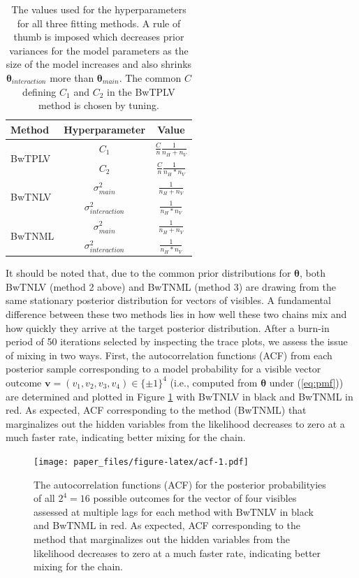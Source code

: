 \documentclass[12pt]{article}
\theoremstyle{definition}
\newcommand{\nv}{{n_{\scriptscriptstyle V}}}
\newcommand{\nh}{{n_{\scriptscriptstyle H}}}
\begin{document}
\begin{table}[ht]
\centering
\begin{tabular}{|l|c|c|}
\hline 
Method & Hyperparameter & Value \\ 
\hline \hline
\multirow{2}{*}{BwTPLV} & $C_1$ & $\frac{C}{n}\frac{1}{\nh + \nv}$ \\
 & $C_2$ & $\frac{C}{n}\frac{1}{\nh*\nv}$ \\
\hline
\multirow{2}{*}{BwTNLV} & $\sigma^2_{main}$ & $\frac{1}{\nh + \nv}$ \\
 & $\sigma^2_{interaction}$ & $\frac{1}{\nh*\nv}$ \\
\hline
\multirow{2}{*}{BwTNML} & $\sigma^2_{main}$ & $\frac{1}{\nh + \nv}$ \\
 & $\sigma^2_{interaction}$ & $\frac{1}{\nh*\nv}$ \\
\hline
\end{tabular}
\caption{The values used for the hyperparameters for all three fitting methods. A rule of thumb is imposed which decreases prior variances for the model parameters as the size of the model increases and also shrinks $\boldsymbol \theta_{interaction}$ more than $\boldsymbol \theta_{main}$. The common $C$ defining $C_1$ and $C_2$  in the BwTPLV method is chosen by tuning.}
\label{tab:hyperparam}
\end{table}
It should be noted that, due to the common prior distributions for
\(\boldsymbol \theta\), both BwTNLV (method 2 above) and BwTNML (method
3) are drawing from the same stationary posterior distribution for
vectors of visibles. A fundamental difference between these two methods
lies in how well these two chains mix and how quickly they arrive at the
target posterior distribution. After a burn-in period of 50 iterations
selected by inspecting the trace plots, we assess the issue of mixing in
two ways. First, the autocorrelation functions (ACF) from each posterior
sample corresponding to a model probability for a visible vector outcome
\(\mathbf{v}=(v_1,v_2,v_3,v_4)\in\{\pm 1\}^4\) (i.e., computed from
\(\boldsymbol \theta\) under (\eqref{eq:pmf})) are determined and plotted
in Figure \ref{fig:acf} with BwTNLV in black and BwTNML in red. As
expected, ACF corresponding to the method (BwTNML) that marginalizes out
the hidden variables from the likelihood decreases to zero at a much
faster rate, indicating better mixing for the chain. \par
\begin{figure}
\centering
\texttt{[image: paper\_files/figure-latex/acf-1.pdf]}
\caption{\label{fig:acf}The autocorrelation functions (ACF) for the
posterior probabilityies of all \(2^4 = 16\) possible outcomes for the
vector of four visibles assessed at multiple lags for each method with
BwTNLV in black and BwTNML in red. As expected, ACF corresponding to the
method that marginalizes out the hidden variables from the likelihood
decreases to zero at a much faster rate, indicating better mixing for
the chain.}
\end{figure}
\end{document}
